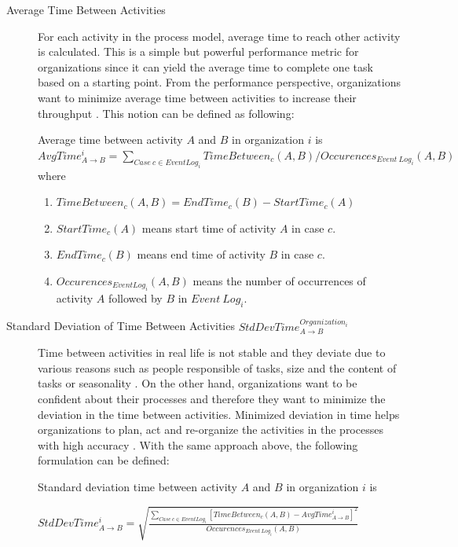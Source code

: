 \begin{description}
  \item[Average Time Between Activities] For each activity in the process model, average time to reach other activity is calculated. This is a simple but powerful performance metric for organizations since it can yield the average time to complete one task based on a starting point. From the performance perspective, organizations want to minimize average time between activities to increase their throughput \cite{van2012replaying}. This notion can be defined as following:
	\theoremstyle{definition}
	\begin{definition}{}
	Average time between activity $A$ and $B$ in organization $i$ is 
	$AvgTime_{A\rightarrow B}^{i} = \sum_{Case\ c \in Event Log_{i}} TimeBetween_{c}(A,B) / Occurences_{Event\ Log_{i}}(A,B)$ where
		\begin{enumerate}
			\item $TimeBetween_{c}(A, B) = EndTime_{c}(B) - StartTime_{c}(A)$
			\item $StartTime_{c}(A)$ means start time of activity $A$ in case $c$.
			\item $EndTime_{c}(B)$ means end time of activity $B$ in case $c$.
			\item $Occurences_{Event Log_{i}}(A, B)$ means the number of occurrences of  activity $A$ followed by $B$ in  $Event\ Log_{i}$.
		\end{enumerate}
	\end{definition}

	\item[Standard Deviation of Time Between Activities $StdDevTime_{A\rightarrow B}^{Organization_{i}}$] Time between activities in real life is not stable and they deviate due to various reasons such as people responsible of tasks, size and the content of tasks or seasonality \cite{van2011process}. On the other hand, organizations want to be confident about their processes and therefore they want to minimize the deviation in the time between activities. Minimized deviation in time helps organizations to plan, act and re-organize the activities in the processes with high accuracy \cite{van2012replaying}. With the same approach above, the following formulation can be defined:
	\theoremstyle{definition}
	\begin{definition}{}
	Standard deviation time between activity $A$ and $B$ in organization $i$ is 

	$StdDevTime_{A\rightarrow B}^{i} = \sqrt{\frac{\sum_{Case\ c \in Event Log_{i}} [TimeBetween_{c}(A, B) - AvgTime_{A\rightarrow B}^{i}]^{2}}{Occurences_{Event\ Log_{i}}(A,B)} }$ 
	\end{definition}
\end{description}

